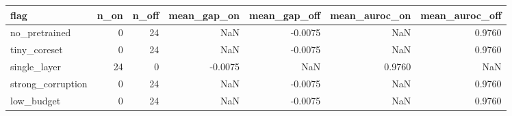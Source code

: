 \begin{tabular}{lrrrrrr}
\toprule
             flag &  n\_on &  n\_off &  mean\_gap\_on &  mean\_gap\_off &  mean\_auroc\_on &  mean\_auroc\_off \\
\midrule
    no\_pretrained &     0 &     24 &          NaN &       -0.0075 &            NaN &          0.9760 \\
     tiny\_coreset &     0 &     24 &          NaN &       -0.0075 &            NaN &          0.9760 \\
     single\_layer &    24 &      0 &      -0.0075 &           NaN &         0.9760 &             NaN \\
strong\_corruption &     0 &     24 &          NaN &       -0.0075 &            NaN &          0.9760 \\
       low\_budget &     0 &     24 &          NaN &       -0.0075 &            NaN &          0.9760 \\
\bottomrule
\end{tabular}
